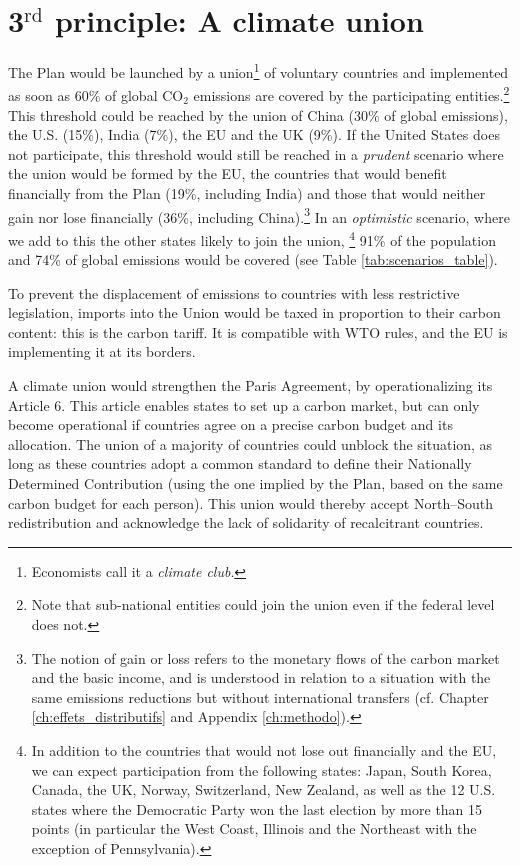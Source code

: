 \documentclass[a5paper,english,openany]{memoir}
\begin{document}
\section{3$^\text{rd}$ principle: A climate union}

The Plan would be launched by a union\footnote{Economists call it a \textit{climate club}.} of voluntary countries and implemented as soon as 60\% of global CO$_\text{2}$ emissions are covered by the participating entities.\footnote{Note that sub-national entities could join the union even if the federal level does not.} This threshold could be reached by the union of China (30\% of global emissions), the U.S. (15\%), India (7\%), the EU and the UK (9\%). If the United States does not participate, this threshold would still be reached in a \textit{prudent} scenario where the union would be formed by the EU, the countries that would benefit financially from the Plan (19\%, including India) and those that would neither gain nor lose financially (36\%, including China).\footnote{The notion of gain or loss refers to the monetary flows of the carbon market and the basic income, and is understood in relation to a situation with the same emissions reductions but without international transfers (cf. Chapter \ref{ch:effets_distributifs} and Appendix \ref{ch:methodo}).} %
In an \textit{optimistic} scenario, where we add to this the other states likely to join the union,%
\footnote{In addition to the countries that would not lose out financially and the EU, we can expect participation from the following states: Japan, South Korea, Canada, the UK, Norway, Switzerland, New Zealand, as well as the 12 U.S. states where the Democratic Party won the last election by more than 15 points (in particular the West Coast, Illinois and the Northeast with the exception of Pennsylvania).} 
91\% of the population and 74\% of global emissions would be covered (see Table \ref{tab:scenarios_table}). 

 

To prevent the displacement of emissions to countries with less restrictive legislation, imports into the Union would be taxed in proportion to their carbon content: this is the carbon tariff. It is compatible with WTO rules, and the EU is implementing it at its borders.

A climate union would strengthen the Paris Agreement, by operationalizing its Article 6. This article enables states to set up a carbon market, but can only become operational if countries agree on a precise carbon budget and its allocation. The union of a majority of countries could unblock the situation, as long as these countries adopt a common standard to define their Nationally Determined Contribution (using the one implied by the Plan, based on the same carbon budget for each person). This union would thereby accept North--South redistribution and acknowledge the lack of solidarity of recalcitrant countries. 
\end{document}
